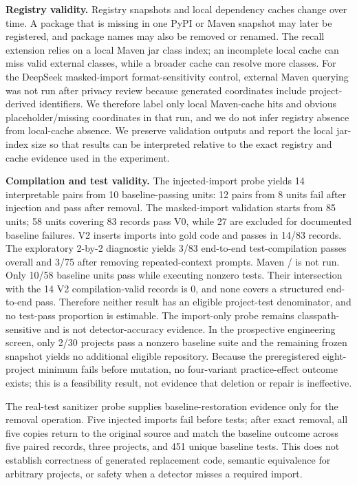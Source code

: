 \documentclass[pdflatex,sn-basic]{sn-jnl}
\newcommand{\codeid}[1]{\texttt{\detokenize{#1}}}
\begin{document}
\textbf{Registry validity.} Registry snapshots and local dependency caches change over time. A package that is missing in one PyPI or Maven snapshot may later be registered, and package names may also be removed or renamed. The recall extension relies on a local Maven jar class index; an incomplete local cache can miss valid external classes, while a broader cache can resolve more classes. For the DeepSeek masked-import format-sensitivity control, external Maven querying was not run after privacy review because generated coordinates include project-derived identifiers. We therefore label only local Maven-cache hits and obvious placeholder/missing coordinates in that run, and we do not infer registry absence from local-cache absence. We preserve validation outputs and report the local jar-index size so that results can be interpreted relative to the exact registry and cache evidence used in the experiment.

\textbf{Compilation and test validity.} The injected-import probe yields 14 interpretable pairs from 10 baseline-passing units: 12 pairs from 8 units fail after injection and pass after removal. The masked-import validation starts from 85 units; 58 units covering 83 records pass V0, while 27 are excluded for documented baseline failures. V2 inserts imports into gold code and passes \codeid{test-compile} in 14/83 records. The exploratory 2-by-2 diagnostic yields 3/83 end-to-end test-compilation passes overall and 3/75 after removing repeated-context prompts. Maven \codeid{package}/\codeid{verify} is not run. Only 10/58 baseline units pass while executing nonzero tests. Their intersection with the 14 V2 compilation-valid records is 0, and none covers a structured end-to-end pass. Therefore neither result has an eligible project-test denominator, and no test-pass proportion is estimable. The import-only probe remains classpath-sensitive and is not detector-accuracy evidence. In the prospective engineering screen, only 2/30 projects pass a nonzero baseline suite and the remaining frozen snapshot yields no additional eligible repository. Because the preregistered eight-project minimum fails before mutation, no four-variant practice-effect outcome exists; this is a feasibility result, not evidence that deletion or repair is ineffective.

The real-test sanitizer probe supplies baseline-restoration evidence only for the removal operation. Five injected imports fail before tests; after exact removal, all five copies return to the original source and match the baseline outcome across five paired records, three projects, and 451 unique baseline tests. This does not establish correctness of generated replacement code, semantic equivalence for arbitrary projects, or safety when a detector misses a required import.
\end{document}
